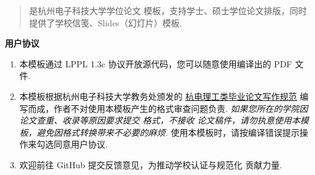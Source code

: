 \begin{abstract}
   是杭州电子科技大学学位论文  模板，支持学士、硕士学位论文排版，同时提供了学校信笺、Slides（幻灯片）模板.
\end{abstract}

\begin{center}
  \small\bfseries 用户协议
\end{center}
\begin{enumerate} [ itemsep = 0pt ] \small
  \item 本模板通过 LPPL 1.3c 协议开放源代码，您可以随意使用编译出的 PDF 文件.
  \item 本模板根据杭州电子科技大学教务处颁发的 \href{https://jwc.hdu.edu.cn/2022/0428/c4528a153813/page.htm}{杭电理工类毕业论文写作规范} 编写而成，作者不对使用本模板产生的格式审查问题负责. \emph{如果您所在的学院因论文查重、收录等原因要求提交  格式，不接收  论文稿件，请勿执意使用本模板，避免因格式转换带来不必要的麻烦.} 使用本模板时，请按编译错误提示操作来勾选同意用户协议.
  \item 欢迎前往 GitHub 提交反馈意见，为推动学校认证与规范化  贡献力量.
\end{enumerate}